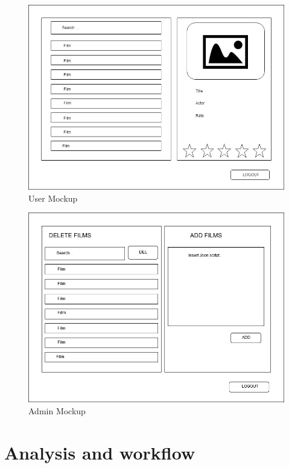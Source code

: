 \documentclass[a4paper, oneside]{article}
\begin{document}
\begin{figure}[h]
\centering
\includegraphics[width=\textwidth]{./images/diagrams/UserMockup} 
\caption{User Mockup}
\label{fig:mockup}
\end{figure}

\begin{figure}[h]
\centering
\includegraphics[width=\textwidth]{./images/diagrams/admin_activity}
\caption{Admin Mockup}
\label{fig:mockup_admin}
\end{figure}

\clearpage

\section{Analysis and workflow}
\end{document}

